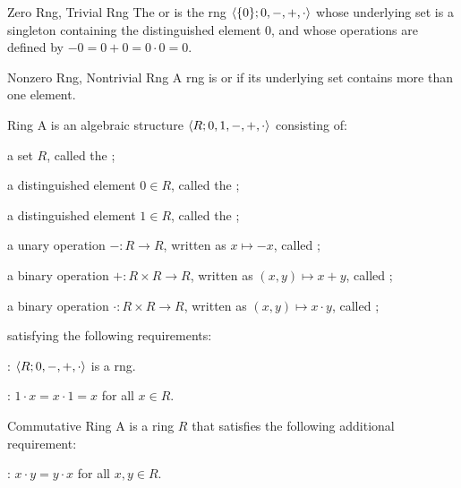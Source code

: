 \documentclass[12pt]{report}
\begin{document}
\begin{dfnbox}{Zero Rng, Trivial Rng}
	The  or  is the rng ${\langle { \{0\}; 0, -, +, \cdot } \rangle}$ whose underlying set is a singleton containing the distinguished element $0$, and whose operations are defined by $-0 = 0 + 0 = 0 \cdot 0 = 0$.
\end{dfnbox}

\begin{dfnbox}{Nonzero Rng, Nontrivial Rng}
	A rng is  or  if its underlying set contains more than one element.
\end{dfnbox}

\begin{dfnbox}{Ring}
	A  is an algebraic structure ${\langle {R; 0, 1, -, +, \cdot} \rangle}$ consisting of:
	\begin{boxitems}
		\item a set $R$, called the ;
		\item a distinguished element $0 \in R$, called the ;
		\item a distinguished element $1 \in R$, called the ;
		\item a unary operation $-: R \to R$, written as $x \mapsto -x$, called ;
		\item a binary operation $+: R \times R \to R$, written as $(x, y) \mapsto x + y$, called ;
		\item a binary operation $\cdot: R \times R \to R$, written as $(x, y) \mapsto x \cdot y$, called ;
	\end{boxitems}
	satisfying the following requirements:
	\begin{boxitems}
		\item {}: ${\langle {R; 0, -, +, \cdot} \rangle}$ is a rng.
		\item {}: $1 \cdot x = x \cdot 1 = x$ for all $x \in R$.
	\end{boxitems}
\end{dfnbox}

\begin{dfnbox}{Commutative Ring}
	A  is a ring $R$ that satisfies the following additional requirement:
	\begin{boxitems}
		\item {}: $x \cdot y = y \cdot x$ for all $x, y \in R$.
	\end{boxitems}
\end{dfnbox}
\end{document}
